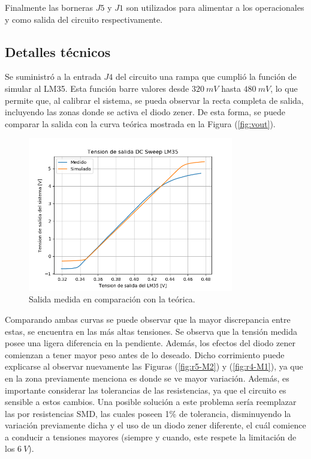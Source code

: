 \documentclass[a4paper]{article}
\begin{document}
Finalmente las borneras $J5$ y $J1$ son utilizados para alimentar a los operacionales y como salida del circuito respectivamente.

\subsection{Detalles técnicos}
Se suministró a la entrada $J4$ del circuito una rampa que cumplió la función de simular al LM35. Esta función barre valores desde $320 \ mV$ hasta $480 \ mV$, lo que permite que, al calibrar el sistema, se pueda observar la recta completa de salida, incluyendo las zonas donde se activa el diodo zener. De esta forma, se puede comparar la salida con la curva teórica mostrada en la Figura (\ref{fig:vout}).

\begin{figure}[H]
	\centering
	\includegraphics[width=0.8\textwidth]{Ejercicio6/Imagenes/Teovsmed.png}
	\caption{Salida medida en comparación con la teórica.}
	\label{fig:comp1}
\end{figure}

Comparando ambas curvas se puede observar que la mayor discrepancia entre estas, se encuentra en las más altas tensiones. Se observa que la tensión medida posee una ligera diferencia en la pendiente. Además, los efectos del diodo zener comienzan a tener mayor peso antes de lo deseado. Dicho corrimiento puede explicarse al observar nuevamente las Figuras (\ref{fig:r5-M2}) y (\ref{fig:r4-M1}), ya que en la zona previamente menciona es donde se ve mayor variación. Además, es importante considerar las tolerancias de las resistencias, ya que el circuito es sensible a estos cambios. Una posible solución a este problema sería reemplazar las por resistencias SMD, las cuales poseen 1\% de tolerancia, disminuyendo la variación previamente dicha y el uso de un diodo zener diferente, el cuál comience a conducir a tensiones mayores (siempre y cuando, este respete la limitación de los $6 \ V$).
\end{document}

